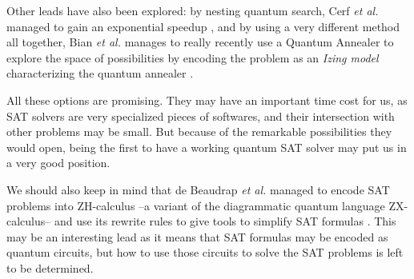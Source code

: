 \documentclass{article}
\begin{document}
Other leads have also been explored: by nesting quantum search, Cerf \emph{et
al.} managed to gain an exponential speedup \cite{CGW00}, and by using a very
different method all together, Bian \emph{et al.} manages to really recently use
a Quantum Annealer to explore the space of possibilities by encoding the problem
as an \emph{Izing model} characterizing the quantum annealer \cite{BCM+20}.

All these options are promising. They may have an important time cost for us, as
SAT solvers are very specialized pieces of softwares, and their intersection
with other problems may be small. But because of the remarkable possibilities
they would open, being the first to have a working quantum SAT solver may put us
in a very good position.

We should also keep in mind that de Beaudrap \emph{et al.} managed to encode SAT
problems into ZH-calculus --a variant of the diagrammatic quantum language
ZX-calculus-- and use its rewrite rules to give tools to simplify SAT formulas
\cite{dKM21}. This may be an interesting lead as it means that SAT formulas may
be encoded as quantum circuits, but how to use those circuits to solve the SAT
problems is left to be determined.



\end{document}

